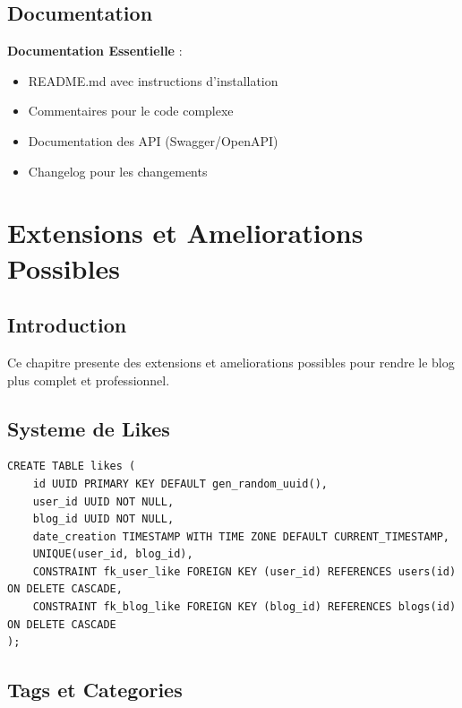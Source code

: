 \documentclass[a4paper,12pt]{book}
\begin{document}
\section{Documentation}

\begin{bestpracticebox}
    \textbf{Documentation Essentielle} :
    \begin{itemize}
        \item README.md avec instructions d'installation
        \item Commentaires pour le code complexe
        \item Documentation des API (Swagger/OpenAPI)
        \item Changelog pour les changements
    \end{itemize}
\end{bestpracticebox}

\chapter{Extensions et Ameliorations Possibles}

\section{Introduction}

Ce chapitre presente des extensions et ameliorations possibles pour rendre le blog plus complet et professionnel.

\section{Systeme de Likes}

\begin{lstlisting}[style=sql, caption=Table des likes]
CREATE TABLE likes (
    id UUID PRIMARY KEY DEFAULT gen_random_uuid(),
    user_id UUID NOT NULL,
    blog_id UUID NOT NULL,
    date_creation TIMESTAMP WITH TIME ZONE DEFAULT CURRENT_TIMESTAMP,
    UNIQUE(user_id, blog_id),
    CONSTRAINT fk_user_like FOREIGN KEY (user_id) REFERENCES users(id) ON DELETE CASCADE,
    CONSTRAINT fk_blog_like FOREIGN KEY (blog_id) REFERENCES blogs(id) ON DELETE CASCADE
);
\end{lstlisting}

\section{Tags et Categories}
\end{document}
